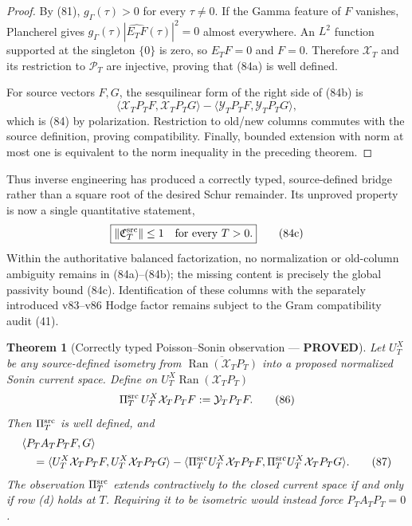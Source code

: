 \documentclass[11pt]{article}
\newtheorem{theorem}{Theorem}
\newcommand{\PROVED}{\textcolor{green!45!black}{\textbf{PROVED}}}
\newcommand{\Ran}{\operatorname{Ran}}
\begin{document}
\begin{proof}
By (81), $g_\Gamma(\tau)>0$ for every $\tau\ne0$.  If the Gamma feature of
$F$ vanishes, Plancherel gives
$g_\Gamma(\tau)|\widehat{E_TF}(\tau)|^2=0$ almost
everywhere.  An $L^2$ function supported at the singleton $\{0\}$ is zero,
so $E_TF=0$ and $F=0$.  Therefore $\mathcal X_T$ and its restriction to
$\mathcal P_T$ are injective, proving that (84a) is well defined.

For source vectors $F,G$, the sesquilinear form of the right side of (84b)
is
\[
 \langle\mathcal X_TP_TF,\mathcal X_TP_TG\rangle
 -\langle\mathcal Y_TP_TF,\mathcal Y_TP_TG\rangle,
\]
which is (84) by polarization.  Restriction to old/new columns commutes with
the source definition, proving compatibility.  Finally, bounded extension
with norm at most one is equivalent to the norm inequality in the preceding
theorem.
\end{proof}

Thus inverse engineering has produced a correctly typed, source-defined
bridge rather than a square root of the desired Schur remainder.  Its
unproved property is now a single quantitative statement,
\begin{equation}
 \boxed{\|\mathfrak C_T^{\rm src}\|\le1
        \quad\hbox{for every }T>0.}                    \tag{84c}
\end{equation}
Within the authoritative balanced factorization, no normalization or
old-column ambiguity remains in (84a)--(84b); the missing content is precisely
the global passivity bound (84c).  Identification of these columns with the
separately introduced v83--v86 Hodge factor remains subject to the Gram
compatibility audit (41).

\begin{theorem}[Correctly typed Poisson--Sonin observation --- \PROVED]
Let $U_T^X$ be any source-defined isometry from
$\overline{\Ran(\mathcal X_TP_T)}$ into a proposed normalized Sonin current
space.  Define on $U_T^X\Ran(\mathcal X_TP_T)$
\begin{equation}
 \Pi_T^{\rm src}\,U_T^X\mathcal X_TP_TF
 :=\mathcal Y_TP_TF.                                   \tag{86}
\end{equation}
Then $\Pi_T^{\rm src}$ is well defined, and
\begin{align}
 &\langle P_TA_TP_TF,G\rangle \notag\\
 &\quad=
 \langle U_T^X\mathcal X_TP_TF,U_T^X\mathcal X_TP_TG\rangle
 -\langle\Pi_T^{\rm src}U_T^X\mathcal X_TP_TF,
          \Pi_T^{\rm src}U_T^X\mathcal X_TP_TG\rangle. \tag{87}
\end{align}
The observation $\Pi_T^{\rm src}$ extends contractively to the closed current
space if and only if row (d) holds at $T$.  Requiring it to be isometric would
instead force $P_TA_TP_T=0$.
\end{theorem}
\end{document}
